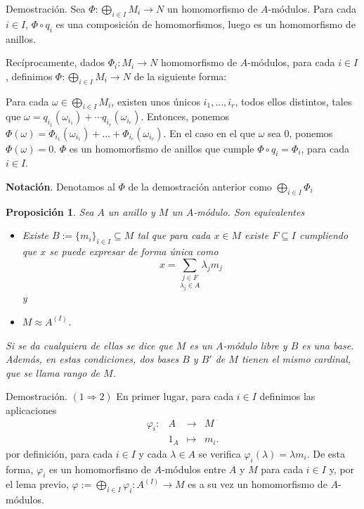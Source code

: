 \documentclass[a4paper,12pt]{article}
\newtheorem{proposition}[theorem]{Proposición}
\theoremstyle{definition}
\begin{document}
Demostración. Sea $\Phi:\bigoplus_{i\in I} M_i \rightarrow N$ un homomorfismo de $A$-módulos. Para cada $i\in I$, $\Phi \circ q_i$ es una composición de homomorfismos, luego es un homomorfismo de anillos.

Recíprocamente, dados $\Phi_i:M_i\rightarrow N$ homomorfismo de $A$-módulos, para cada $i\in I$, definimos $\Phi:\bigoplus_{i\in I} M_i\rightarrow N$ de la siguiente forma:

Para cada $\omega \in \bigoplus_{i\in I} M_i$, existen unos únicos $i_1,...,i_r$, todos ellos distintos, tales que $\omega=q_{i_1}(\omega_{i_1})+\cdots q_{i_r}(\omega_{i_r})$. Entonces, ponemos $\Phi(\omega)=\Phi_{i_1}(\omega_{i_1})+...+\Phi_{i_r}(\omega_{i_r})$. En el caso en el que $\omega$ sea $0$, ponemos $\Phi(\omega)=0$. $\Phi$ es un homomorfismo de anillos que cumple $\Phi\circ q_i = \Phi_i$, para cada $i\in I$.

\textbf{Notación}. Denotamos al $\Phi$ de la demostración anterior como $\bigoplus_{i\in I} \Phi_i$

\begin{proposition} Sea $A$ un anillo y $M$ un $A$-módulo. Son equivalentes
\begin{itemize}
    \item[1)] Existe $B:={\{m_i\}}_{i\in I}\subseteq M$ tal que para cada $x\in M$ existe $F\subseteq I$ cumpliendo que $x$ se puede expresar de forma única como$$x=\underset{\lambda_j\in A}{\sum_{j\in F}}\lambda_j m_j$$ y 
    \item[2)] $M\approx A^{(I)}$.
\end{itemize}
Si se da cualquiera de ellas se dice que $M$ es un \textit{$A$-módulo libre} y $B$ es una base. Además, en estas condiciones, dos bases $B$ y $B'$ de $M$ tienen el mismo cardinal, que se llama \textit{rango de $M$}.
\end{proposition}

Demostración. $(1\Rightarrow 2)$ En primer lugar, para cada $i\in I$ definimos las aplicaciones
$$\begin{array}{rccl}
    \varphi_i:&A&\longrightarrow&M\\
    &1_A&\longmapsto&m_i.
\end{array}$$
por definición, para cada $i\in I$ y cada $\lambda\in A$ se verifica $\varphi_i(\lambda)=\lambda m_i$. 
De esta forma, $\varphi_i$ es un homomorfismo de $A$-módulos entre $A$ y $M$ para cada $i\in I$ y, por el lema previo, $\varphi:=\bigoplus_{i\in I}\varphi_i: A^{(I)}\longrightarrow M$ es a su vez un homomorfismo de $A$-módulos.
\end{document}
